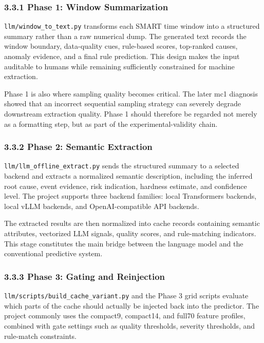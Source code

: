 \documentclass[
  11pt,
  a4paper]{article}
\begin{document}
\hypertarget{phase-1-window-summarization}{%
\subsubsection{3.3.1 Phase 1: Window
Summarization}\label{phase-1-window-summarization}}

\texttt{llm/window\_to\_text.py} transforms each SMART time window into
a structured summary rather than a raw numerical dump. The generated
text records the window boundary, data-quality cues, rule-based scores,
top-ranked causes, anomaly evidence, and a final rule prediction. This
design makes the input auditable to humans while remaining sufficiently
constrained for machine extraction.

Phase 1 is also where sampling quality becomes critical. The later mc1
diagnosis showed that an incorrect sequential sampling strategy can
severely degrade downstream extraction quality. Phase 1 should therefore
be regarded not merely as a formatting step, but as part of the
experimental-validity chain.

\hypertarget{phase-2-semantic-extraction}{%
\subsubsection{3.3.2 Phase 2: Semantic
Extraction}\label{phase-2-semantic-extraction}}

\texttt{llm/llm\_offline\_extract.py} sends the structured summary to a
selected backend and extracts a normalized semantic description,
including the inferred root cause, event evidence, risk indication,
hardness estimate, and confidence level. The project supports three
backend families: local Transformers backends, local vLLM backends, and
OpenAI-compatible API backends.

The extracted results are then normalized into cache records containing
semantic attributes, vectorized LLM signals, quality scores, and
rule-matching indicators. This stage constitutes the main bridge between
the language model and the conventional predictive system.

\hypertarget{phase-3-gating-and-reinjection}{%
\subsubsection{3.3.3 Phase 3: Gating and
Reinjection}\label{phase-3-gating-and-reinjection}}

\texttt{llm/scripts/build\_cache\_variant.py} and the Phase 3 grid
scripts evaluate which parts of the cache should actually be injected
back into the predictor. The project commonly uses the compact9,
compact14, and full70 feature profiles, combined with gate settings such
as quality thresholds, severity thresholds, and rule-match constraints.
\end{document}
